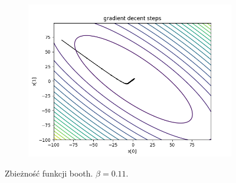 \begin{figure}[h!]
\begin{subfigure}[b]{0.45\linewidth}
			\includegraphics[width=\linewidth]{photos/booth3.png}
		\end{subfigure}
			\caption{Zbieżność funkcji booth. $\beta = 0.11$.}
	\end{figure}
	\newpage
	
